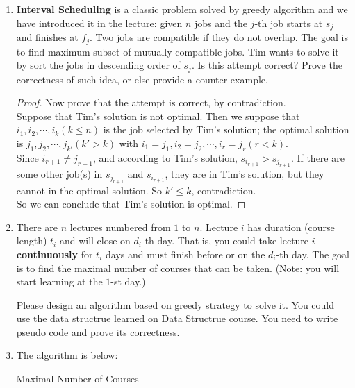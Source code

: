 \documentclass[12pt,a4paper]{article}
\makeatletter
\newtheorem*{solution}{Solution}
\theoremstyle{definition}
\renewenvironment{solution}[1][Solution] {\par\pushQED{\qed}\normalfont\topsep6\p@\@plus6\p@\relax\trivlist\item[\hskip\labelsep\bfseries#1\@addpunct{.}]\ignorespaces}{\popQED\endtrivlist\@endpefalse} \makeatother
\makeatother
\begin{document}
\begin{enumerate}
    \item
    \textbf{Interval Scheduling} is a classic problem solved by greedy algorithm and we have introduced it in the lecture: given $n$ jobs and the $j$-th job starts at $s_j$ and finishes at $f_j$. Two jobs are compatible if they do not overlap. The goal is to find maximum subset of mutually compatible jobs. Tim wants to solve it by sort the jobs in descending order of $s_j$. Is this attempt correct? Prove the correctness of such idea, or else provide a counter-example.
    
    
    \begin{proof}
        Now prove that the attempt is correct, by contradiction.\\
        Suppose that Tim's solution is not optimal. Then we suppose that $ i_1, i_2,\cdots, i_k (k \leq n)$ is the job selected by Tim's solution; the optimal solution is $j_1, j_2,\cdots,j_{k'}(k' > k)$ with $ i_1 = j_1, i_2 = j_2,\cdots,i_r = j_r(r < k)$.\\
        Since $i_{r+1} \neq j_{r+1}$, and according to Tim's solution, $ s_{i_{r+1}} > s_{j_{r+1}} $. If there are some other job(s) in $ s_{j_{r+1}} $ and $ s_{i_{r+1}} $, they are in Tim's solution, but they cannot in the optimal solution. So $ k'\leq k $, contradiction.\\
        So we can conclude that Tim's solution is optimal.
    \end{proof}

    \item
    There are $n$ lectures numbered from $1$ to $n$. Lecture $i$ has duration (course length) $t_i$ and will close on $d_i$-th day. That is, you could take lecture $i$ \textbf{continuously} for $t_i$ days and must finish before or on the $d_i$-th day. The goal is to find the maximal number of courses that can be taken. (Note: you will start learning at the $1$-st day.)
    
    Please design an algorithm based on greedy strategy to solve it. You could use the data structrue learned on Data Structrue course. You need to write pseudo code and prove its correctness.

    \begin{solution}
        The algorithm is below:\\
        \begin{minipage}[t]{0.90\textwidth}
        	\begin{algorithm}[H]
        		\BlankLine
        		\caption{Maximal Number of Courses}
        		\label{Alg-MaxCourses}
        		

\end{algorithm}
\end{minipage}
\end{solution}
\end{enumerate}
\end{document}
